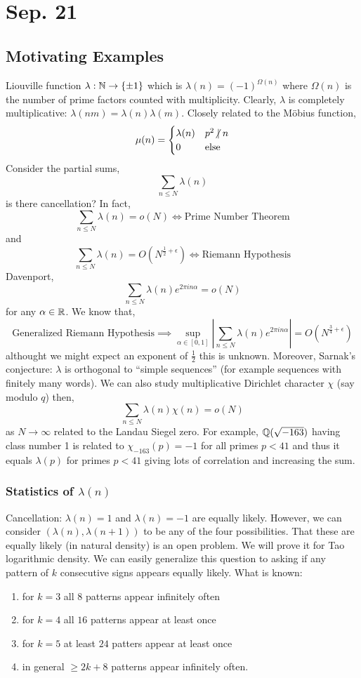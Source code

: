\documentclass[12pt]{article}
\begin{document}
\section{Sep. 21}

\subsection{Motivating Examples}

Liouville function $\lambda : \mathbb{N} \to \{ \pm 1 \}$ which is $\lambda(n) = (-1)^{\Omega(n)}$ where $\Omega(n)$ is the number of prime factors counted with multiplicity. Clearly, $\lambda$ is completely multiplicative: $\lambda(nm) = \lambda(n) \lambda(m)$. Closely related to the M\"{o}bius function,
\[ \mu(n) = \begin{cases}
\lambda(n) & p^2 \ndivides n
\\
0 & \text{else} 
\end{cases} \]
Consider the partial sums,
\[ \sum_{n \le N} \lambda(n) \]
is there cancellation? In fact,
\[ \sum_{n \le N} \lambda(n) = o(N) \iff \text{Prime Number Theorem} \]
and
\[ \sum_{n \le N} \lambda(n) = O(N^{\frac{1}{2} + \epsilon}) \iff \text{Riemann Hypothesis} \]
Davenport,
\[ \sum_{n \le N} \lambda(n) e^{2 \pi i n \alpha} = o(N) \] 
for any $\alpha \in \mathbb{R}$. We know that,
\[ \text{Generalized Riemann Hypothesis} \implies \sup_{\alpha \in [0,1]} \left| \sum_{n \le N} \lambda(n) e^{2 \pi i n \alpha} \right| = O(N^{\frac{3}{4} + \epsilon}) \]
althought we might expect an exponent of $\frac{1}{2}$ this is unknown. Moreover, Sarnak's conjecture: $\lambda$ is orthogonal to ``simple sequences'' (for example sequences with finitely many words). We can also study multiplicative Dirichlet character $\chi$ (say modulo $q$) then,
\[ \sum_{n \le N} \lambda(n) \chi(n) = o(N) \]
as $N \to \infty$ related to the Landau Siegel zero. For example, $\mathbb{Q}(\sqrt{-163})$ having class number 1 is related to $\chi_{-163}(p) = -1$ for all primes $p < 41$ and thus it equals $\lambda(p)$ for primes $p  < 41$ giving lots of correlation and increasing the sum.

\subsubsection{Statistics of $\lambda(n)$}

Cancellation: $\lambda(n) = 1$ and $\lambda(n) = -1$ are equally likely. However, we can consider $(\lambda(n), \lambda(n+1))$ to be any of the four possibilities. That these are equally likely (in natural density) is an open problem. We will prove it for Tao logarithmic density. We can easily generalize this question to asking if any pattern of $k$ consecutive signs appears equally likely. What is known:
\begin{enumerate}
\item for $k = 3$ all $8$ patterns appear infinitely often
\item for $k = 4$ all $16$ patterns appear at least once
\item for $k = 5$ at least $24$ patters appear at least once
\item in general $\ge 2 k + 8$ patterns appear infinitely often.
\end{enumerate}
\end{document}
